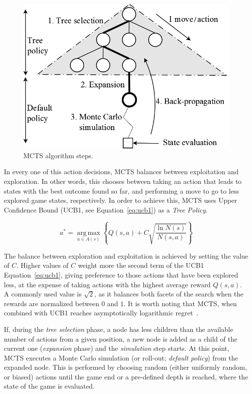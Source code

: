 \documentclass[journal]{IEEEtran}
\newcommand{\argmax}{\operatorname*{arg\,max}}
\begin{document}
\begin{figure} [!t]
	\begin{center}
	\includegraphics[scale=0.4,natwidth=708,natheight=484]{img/mcts.png}
	\caption{MCTS algorithm steps.}
	\label{fig:mcts}
	\end{center}
\end{figure}

In every one of this action decisions, MCTS balances between exploitation and exploration. In other words, this chooses between taking an action that leads to states with the best outcome found so far, and performing a move to go to less explored game states, respectively. In order to achieve this, MCTS uses Upper Confidence Bound (UCB1, see Equation~\ref{eq:ucb1}) as a \textit{Tree Policy}. 

\begin{equation}	\label{eq:ucb1}
a^* = \argmax_{a \in A(s)} \left\{Q(s,a) + C \sqrt{\frac{ \ln N(s) }{ N(s,a) }}\right\}
\end{equation}

The balance between exploration and exploitation is achieved by setting the value of $C$. Higher values of $C$ weight more the second term of the UCB1 Equation~\ref{eq:ucb1}, giving preference to those actions that have been explored less, at the expense of taking actions with the highest average reward $Q(s,a)$. A commonly used value is $\sqrt{2}$, as it balances both facets of the search when the rewards are normalized between $0$ and $1$. It is worth noting that MCTS, when combined with UCB1 reaches asymptotically logarithmic regret~\cite{coquelin2007bandit}. 

If, during the \textit{tree selection} phase, a node has less children than the available number of actions from a given position, a new node is added as a child of the current one (\textit{expansion} phase) and the \textit{simulation} step starts. At this point, MCTS executes a Monte Carlo simulation (or roll-out; \textit{default policy}) from the expanded node. This is performed by choosing random (either uniformly random, or biased) actions until the game end or a pre-defined depth is reached, where the state of the game is evaluated. 
\end{document}

